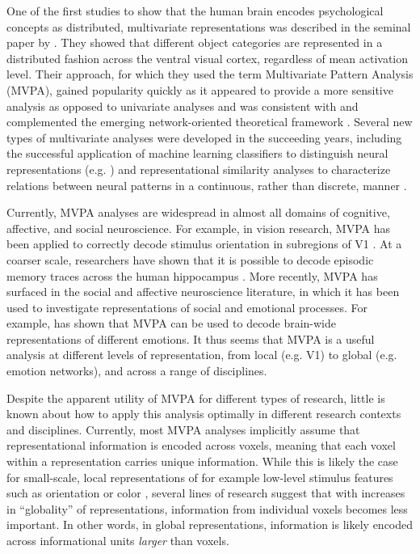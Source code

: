 \documentclass[jou,12pt,a4paper]{apa6}\usepackage[]{graphicx}\usepackage[]{color}
\begin{document}
One of the first studies to show that the human brain encodes psychological concepts as distributed, multivariate representations was described in the seminal paper by \cite{haxby2001}. They showed that different object categories are represented in a distributed fashion across the ventral visual cortex, regardless of mean activation level. Their approach, for which they used the term Multivariate Pattern Analysis (MVPA), gained popularity quickly as it appeared to provide a more sensitive analysis as opposed to univariate analyses \cite{norman2006,mahmoudi2012} and was consistent with and complemented the emerging network-oriented theoretical framework \cite{bressler2010}. Several new types of multivariate analyses were developed in the succeeding years, including the successful application of machine learning classifiers to distinguish neural representations (e.g. ) and representational similarity analyses to characterize relations between neural patterns in a continuous, rather than discrete, manner \cite{kriegeskorte2008}. 

Currently, MVPA analyses are widespread in almost all domains of cognitive, affective, and social neuroscience. For example, in vision research, MVPA has been applied to correctly decode stimulus orientation in subregions of V1 \cite{kamitani2005}. At a coarser scale, researchers have shown that it is possible to decode episodic memory traces across the human hippocampus \cite{chadwick2010}. More recently, MVPA has surfaced in the social and affective neuroscience literature, in which it has been used to investigate representations of social and emotional processes. For example,  has shown that MVPA can be used to decode brain-wide representations of different emotions. It thus seems that MVPA is a useful analysis at different levels of representation, from local (e.g. V1) to global (e.g. emotion networks), and across a range of disciplines.     

Despite the apparent utility of MVPA for different types of research, little is known about how to apply this analysis optimally in different research contexts and disciplines. Currently, most MVPA analyses implicitly assume that representational information is encoded across voxels, meaning that each voxel within a representation carries unique information. While this is likely the case for small-scale, local representations of for example low-level stimulus features such as orientation \cite{kamitani2005} or color \cite{brouwer2009}, several lines of research suggest that with increases in ``globality'' of representations, information from individual voxels becomes less important. In other words, in global representations, information is likely encoded across informational units \emph{larger} than voxels. 
\end{document}
